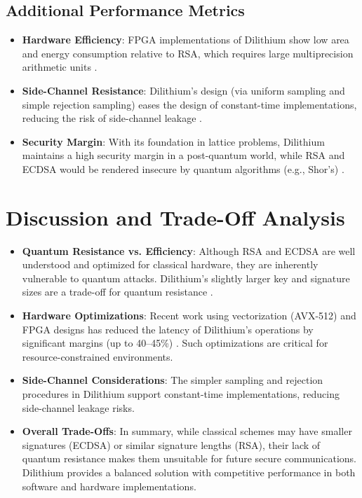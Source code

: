 \documentclass{article}
\begin{document}
\subsection{Additional Performance Metrics}
\begin{itemize}
    \item \textbf{Hardware Efficiency}: FPGA implementations of Dilithium show low area and energy consumption relative to RSA, which requires large multiprecision arithmetic units \cite{ref2, ref6}.
    \item \textbf{Side-Channel Resistance}: Dilithium’s design (via uniform sampling and simple rejection sampling) eases the design of constant-time implementations, reducing the risk of side-channel leakage \cite{ref0}.
    \item \textbf{Security Margin}: With its foundation in lattice problems, Dilithium maintains a high security margin in a post-quantum world, while RSA and ECDSA would be rendered insecure by quantum algorithms (e.g., Shor's) \cite{ref5, ref11}.
\end{itemize}

\section{Discussion and Trade-Off Analysis}
\begin{itemize}
    \item \textbf{Quantum Resistance vs. Efficiency}: Although RSA and ECDSA are well understood and optimized for classical hardware, they are inherently vulnerable to quantum attacks. Dilithium’s slightly larger key and signature sizes are a trade-off for quantum resistance \cite{ref0, ref4}.
    \item \textbf{Hardware Optimizations}: Recent work using vectorization (AVX-512) and FPGA designs has reduced the latency of Dilithium’s operations by significant margins (up to 40–45\%) \cite{ref9, ref6}. Such optimizations are critical for resource-constrained environments.
    \item \textbf{Side-Channel Considerations}: The simpler sampling and rejection procedures in Dilithium support constant-time implementations, reducing side-channel leakage risks.
    \item \textbf{Overall Trade-Offs}: In summary, while classical schemes may have smaller signatures (ECDSA) or similar signature lengths (RSA), their lack of quantum resistance makes them unsuitable for future secure communications. Dilithium provides a balanced solution with competitive performance in both software and hardware implementations.
\end{itemize}
\end{document}
